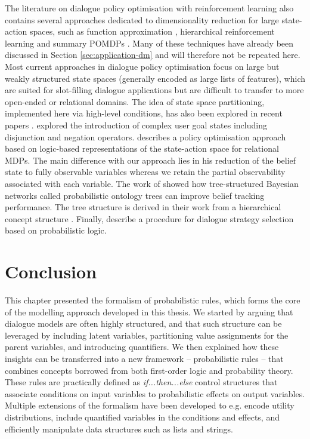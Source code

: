 The literature on dialogue policy optimisation with reinforcement learning also contains several approaches dedicated to dimensionality reduction for large state-action spaces, such as function approximation \citep{Henderson:2008}, hierarchical reinforcement learning \citep{Cuayahuitl:2010} and summary POMDPs \citep{Young:2010}.  Many of these techniques have already been discussed in Section \ref{sec:application-dm} and will therefore not be repeated here. Most current approaches in dialogue policy optimisation focus on large but weakly structured state spaces (generally encoded as large lists of features), which are suited for slot-filling dialogue applications but are difficult to transfer to more open-ended or relational domains.  The idea of state space partitioning, implemented here via high-level conditions, has also been explored in recent papers \citep{Williams2010}. \cite{Crook:2010} explored the introduction of complex user goal states including disjunction and negation operators. \cite{Heriberto2011} describes a policy optimisation approach based on logic-based representations of the state-action space for relational MDPs. The main difference with our approach lies in his reduction of the belief state to fully observable variables whereas we retain the partial observability associated with each variable.  The work of \cite{Mehta:2010,Raux2011} showed how tree-structured Bayesian networks called probabilistic ontology trees can improve belief tracking performance.  The tree structure is derived in their work from a hierarchical concept structure .  Finally, \cite{neill2011} describe a procedure for dialogue strategy selection based on probabilistic logic.

\section{Conclusion}

This chapter presented the formalism of probabilistic rules, which forms the core of the modelling approach developed in this thesis. We started by arguing that dialogue models are often highly structured, and that such structure can be leveraged by including latent variables, partitioning value assignments for the parent variables, and introducing quantifiers. We then explained how these insights can be transferred into a new framework -- probabilistic rules -- that combines concepts borrowed from both first-order logic and probability theory.  These rules are practically defined as \textit{if...then...else} control structures that associate conditions on input variables to probabilistic effects on output variables.  Multiple extensions of the formalism have been developed to e.g. encode utility distributions, include quantified variables in the conditions and effects, and efficiently manipulate data structures such as lists and strings. 

